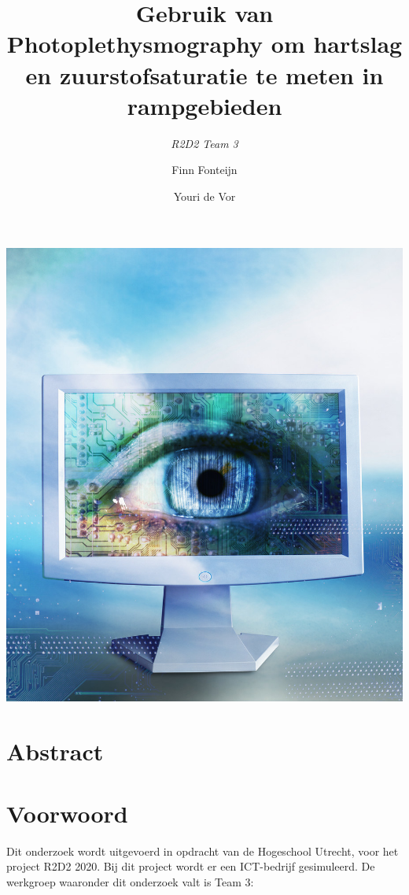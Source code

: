 \documentclass[11pt]{article}
\title{Gebruik van Photoplethysmography om hartslag en zuurstofsaturatie te meten in rampgebieden}
\author{\emph{R2D2 Team 3} \and Finn Fonteijn \and Youri de Vor}
\begin{document}
    \begin{titlepage}
        \centering
        \maketitle
        \includegraphics[height=0.6\textheight]{Images/vision.jpg}
        \clearpage
    \end{titlepage}


    \clearpage
    \tableofcontents

    \clearpage

    \section{Abstract}\label{sec:abstract}

    \section{Voorwoord}\label{sec:voorwoord}
    Dit onderzoek wordt uitgevoerd in opdracht van de Hogeschool Utrecht, voor het project R2D2 2020.
    Bij dit project wordt er een ICT-bedrijf gesimuleerd.
    De werkgroep waaronder dit onderzoek valt is Team 3:\\
    \\
\end{document}
